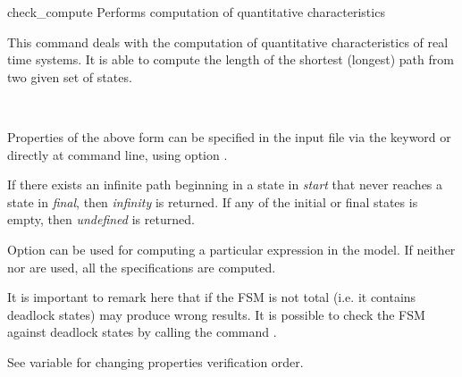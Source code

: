 \begin{nusmvCommand}{check\_compute} {Performs computation of quantitative characteristics}


This command deals with the computation of quantitative
characteristics of real time systems. It is able to compute the length
of the shortest (longest) path from two given set of states.
\begin{center}
 \\
\end{center}
Properties of the above form can be specified in the input file via
the keyword  or directly at command line, using option
.

If there exists an infinite path beginning in a state in
\textit{start} that never reaches a state in \textit{final}, then
\textit{infinity} is returned. If any of the initial or final states 
is empty, then \textit{undefined} is returned.

Option  can be used for computing a particular
expression in the model. If neither  nor 
are used, all the  specifications are computed.

It is important to remark here that if the FSM is not total (i.e. it
contains deadlock states)  may produce wrong
results. It is possible to check the FSM against deadlock states by
calling the command .

See variable  for changing properties
verification order.

\begin{cmdOpt}






\end{cmdOpt}
\end{nusmvCommand}
